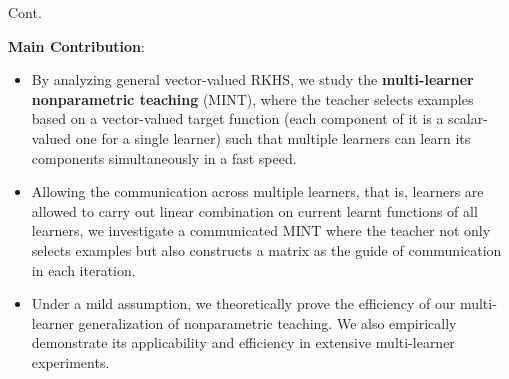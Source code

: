 \documentclass[aspectratio=169,xcolor=dvipsnames]{beamer}
\begin{document}
\begin{frame}{Cont.}

{\bf \color{blue} Main Contribution}: 
\begin{itemize}
\justifying
\item By analyzing general \alert{vector-valued RKHS}, we study the {\bf multi-learner nonparametric teaching} (MINT), where the teacher selects examples based on a \alert{vector-valued target function} (each component of it is a scalar-valued one for a single learner) such that \alert{multiple} learners can learn its components simultaneously in a fast speed. 
\item Allowing the \alert{communication} across multiple learners, that is, learners are allowed to carry out \alert{linear combination} on current learnt functions of all learners, we investigate a communicated MINT where the teacher not only selects examples but also constructs a \alert{matrix} as the guide of communication in each iteration. 
\item Under a mild assumption, we \alert{theoretically} prove the efficiency of our \alert{multi-learner generalization} of nonparametric teaching. We also \alert{empirically} demonstrate its applicability and efficiency in extensive multi-learner experiments.
\end{itemize}
\end{frame}
\end{document}
